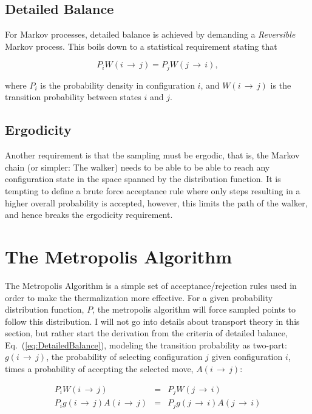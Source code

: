 \subsection{Detailed Balance} 

For Markov processes, detailed balance is achieved by demanding a \textit{Reversible} Markov process. This boils down to a statistical requirement stating that 

\begin{equation}
 \label{eq:DetailedBalance}
 P_iW(i\,\rightarrow\,j) = P_jW(j\,\rightarrow\,i),
\end{equation}

where $P_i$ is the probability density in configuration $i$, and $W(i\,\rightarrow\,j)$ is the transition probability between states $i$ and $j$. 

\subsection{Ergodicity}

Another requirement is that the sampling must be ergodic, that is, the Markov chain (or simpler: The walker) needs to be able to be able to reach any configuration state in the space spanned by the distribution function. It is tempting to define a brute force acceptance rule where only steps resulting in a higher overall probability is accepted, however, this limits the path of the walker, and hence breaks the ergodicity requirement.

\section{The Metropolis Algorithm}
\label{sec:MetroMain}

The Metropolis Algorithm is a simple set of acceptance/rejection rules used in order to make the thermalization more effective. For a given probability distribution function, $P$, the metropolis algorithm will force sampled points to follow this distribution. I will not go into details about transport theory in this section, but rather start the derivation from the criteria of detailed balance, Eq.~(\ref{eq:DetailedBalance}), modeling the transition probability as two-part: $g(i\,\rightarrow\,j)$, the probability of selecting configuration $j$ given configuration $i$, times a probability of accepting the selected move, $A(i\,\rightarrow\,j)$:

\begin{eqnarray}
 \label{eq:metro1}
 P_iW(i\,\rightarrow\,j) &=& P_jW(j\,\rightarrow\,i) \nonumber \\
 P_ig(i\,\rightarrow\,j)A(i\,\rightarrow\,j) &=& P_jg(j\,\rightarrow\,i)A(j\,\rightarrow\,i)
\end{eqnarray}

